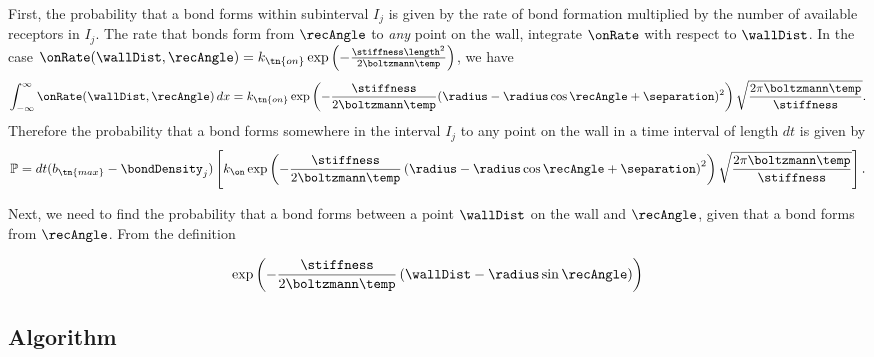 First, the probability that a bond forms within subinterval $I_j$ is
given by the rate of bond formation multiplied by the number of
available receptors in $I_j$. The rate that bonds form from $\recAngle$
to \emph{any} point on the wall, integrate $\onRate$ with respect to
$\wallDist$. In the case $\onRate(\wallDist, \recAngle) = k_\tn{on} \exp\left(-\frac{\stiffness
    \length^2}{2\boltzmann \temp}\right)$, we have
\begin{equation}
  \label{eq:total_fm_rate}
  \int_{-\infty}^{\infty} \onRate(\wallDist, \recAngle)\, dx = k_\tn{on} \exp
  \left( -\frac{\stiffness}{2\boltzmann \temp} (\radius - \radius \cos\recAngle + \separation)^2 \right)
  \sqrt{\frac{2 \pi \boltzmann \temp}{\stiffness}}.
\end{equation}
Therefore the probability that a bond forms somewhere in the interval
$I_j$ to any point on the wall in a time interval of length $dt$ is
given by 
\begin{equation}
  \label{eq:1}
  \mathbb{P} = dt (b_\tn{max} - \bondDensity_j) \left[ k_\on \exp \left( -
      \frac{\stiffness}{2 \boltzmann \temp} \left( \radius - \radius\cos\recAngle + \separation \right)^2 \right)
    \sqrt{\frac{2\pi \boltzmann \temp}{\stiffness}} \right].
\end{equation}

Next, we need to find the probability that a bond forms between a
point $\wallDist$ on the wall and $\recAngle$, given that a bond forms from
$\recAngle$. From the definition 

\begin{equation}
  \label{eq:2}
  \exp \left(-\frac{\stiffness}{2 \boltzmann \temp}
    \left(\wallDist - \radius \sin{\recAngle} \right) \right)
\end{equation}

\subsection{Algorithm}
\label{sec:algorithm}

